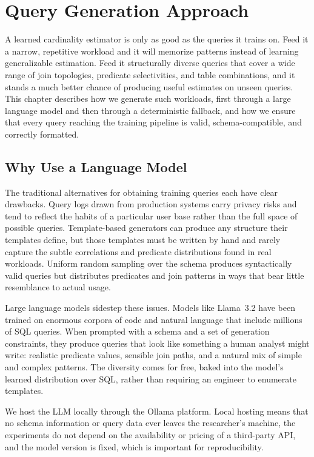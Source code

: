 \chapter{Query Generation Approach}
\label{chap:query_generation}
\pagestyle{plain}

A learned cardinality estimator is only as good as the queries it trains on. Feed it a narrow, repetitive workload and it will memorize patterns instead of learning generalizable estimation. Feed it structurally diverse queries that cover a wide range of join topologies, predicate selectivities, and table combinations, and it stands a much better chance of producing useful estimates on unseen queries. This chapter describes how we generate such workloads, first through a large language model and then through a deterministic fallback, and how we ensure that every query reaching the training pipeline is valid, schema-compatible, and correctly formatted.


\section{Why Use a Language Model}

The traditional alternatives for obtaining training queries each have clear drawbacks. Query logs drawn from production systems carry privacy risks and tend to reflect the habits of a particular user base rather than the full space of possible queries. Template-based generators can produce any structure their templates define, but those templates must be written by hand and rarely capture the subtle correlations and predicate distributions found in real workloads. Uniform random sampling over the schema produces syntactically valid queries but distributes predicates and join patterns in ways that bear little resemblance to actual usage.

Large language models sidestep these issues. Models like Llama~3.2 have been trained on enormous corpora of code and natural language that include millions of SQL queries. When prompted with a schema and a set of generation constraints, they produce queries that look like something a human analyst might write: realistic predicate values, sensible join paths, and a natural mix of simple and complex patterns. The diversity comes for free, baked into the model's learned distribution over SQL, rather than requiring an engineer to enumerate templates.

We host the LLM locally through the Ollama platform. Local hosting means that no schema information or query data ever leaves the researcher's machine, the experiments do not depend on the availability or pricing of a third-party API, and the model version is fixed, which is important for reproducibility.


